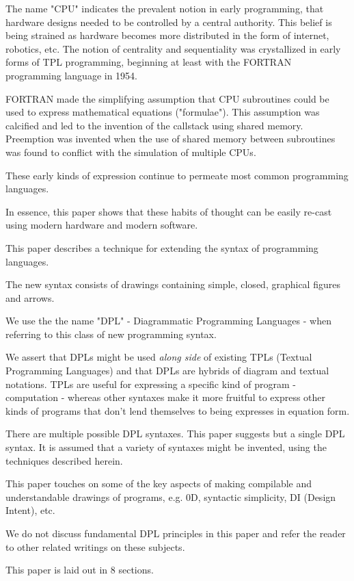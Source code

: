 \documentclass[10pt]{acmart}
\begin{document}
The name "CPU" indicates the prevalent notion in early programming, that
hardware designs needed to be controlled by a central authority. This
belief is being strained as hardware becomes more distributed in the
form of internet, robotics, etc. The notion of centrality and
sequentiality was crystallized in early forms of TPL programming,
beginning at least with the FORTRAN programming language in 1954.

FORTRAN made the simplifying assumption that CPU subroutines could be
used to express mathematical equations ("formulae"). This assumption was
calcified and led to the invention of the callstack using shared memory.
Preemption was invented when the use of shared memory between
subroutines was found to conflict with the simulation of multiple CPUs.

These early kinds of expression continue to permeate most common
programming languages.

In essence, this paper shows that these habits of thought can be easily
re-cast using modern hardware and modern software.

This paper describes a technique for extending the syntax of programming
languages.

The new syntax consists of drawings containing simple, closed, graphical
figures and arrows.

We use the the name "DPL" - Diagrammatic Programming Languages - when
referring to this class of new programming syntax.

We assert that DPLs might be used \emph{along side} of existing TPLs (Textual
Programming Languages) and that DPLs are hybrids of diagram and textual
notations. TPLs are useful for expressing a specific kind of program -
computation - whereas other syntaxes make it more fruitful to express
other kinds of programs that don't lend themselves to being expresses in
equation form.

There are multiple possible DPL syntaxes. This paper suggests but a
single DPL syntax. It is assumed that a variety of syntaxes might be
invented, using the techniques described herein.

This paper touches on some of the key aspects of making compilable and
understandable drawings of programs, e.g. 0D, syntactic simplicity, DI
(Design Intent), etc.

We do not discuss fundamental DPL principles in this paper and refer the
reader to other related writings on these subjects.

This paper is laid out in 8 sections.
\end{document}
